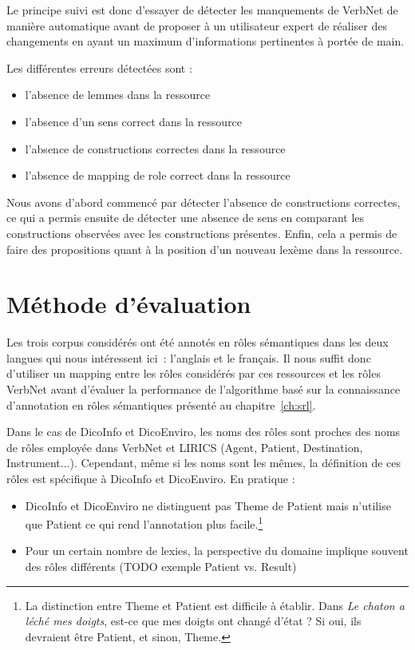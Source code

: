 Le principe suivi est donc d'essayer de détecter les manquements de VerbNet de
manière automatique avant de proposer à un utilisateur expert de réaliser des
changements en ayant un maximum d'informations pertinentes à portée de main.

Les différentes erreurs détectées sont :
\begin{itemize}
    \item l'absence de lemmes dans la ressource
    \item l'absence d'un sens correct dans la ressource
    \item l'absence de constructions correctes dans la ressource
    \item l'absence de mapping de role correct dans la ressource
\end{itemize}

Nous avons d'abord commencé par détecter l'absence de constructions correctes,
ce qui a permis ensuite de détecter une absence de sens en comparant les
constructions observées avec les constructions présentes. Enfin, cela a permis
de faire des propositions quant à la position d'un nouveau lexème dans la
ressource.

\section{Méthode d'évaluation}

Les trois corpus considérés ont été annotés en rôles sémantiques dans les deux
langues qui nous intéressent ici~: l'anglais et le français. Il nous suffit
donc d'utiliser un mapping entre les rôles considérés par ces ressources et les
rôles VerbNet avant d'évaluer la performance de l'algorithme basé sur la
connaissance d'annotation en rôles sémantiques présenté au
chapitre~\ref{ch:srl}.

Dans le cas de DicoInfo et DicoEnviro, les noms des rôles sont proches des noms
de rôles employée dans VerbNet et LIRICS \citep{bonial2011hierarchical} (Agent,
Patient, Destination, Instrument...). Cependant, même si les noms sont les
mêmes, la définition de ces rôles est spécifique à DicoInfo et DicoEnviro.
En pratique :

\begin{itemize}
    \item DicoInfo et DicoEnviro ne distinguent pas Theme de Patient mais
    n'utilise que Patient ce qui rend l'annotation plus facile.\footnote{La
    distinction entre Theme et Patient est difficile à établir. Dans \textit{Le
    chaton a léché mes doigts}, est-ce que mes doigts ont changé d'état ? Si oui,
    ils devraient être Patient, et sinon, Theme.\citep[p.~5]{palmer2010semantic}}
    \item Pour un certain nombre de lexies, la perspective du domaine implique
    souvent des rôles différents (TODO exemple Patient vs. Result) %
\end{itemize}

